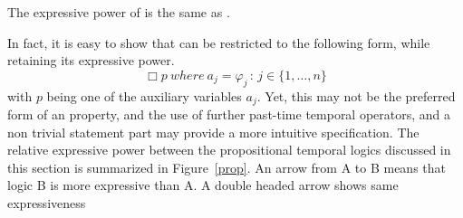 \begin{lemma}
\label{simplecase}
The expressive power of 
\EPLTL{} is the same as \QPLTL{}.
\end{lemma}
In fact, it is easy to show that \EPLTL{} can be restricted to the following form, while retaining its expressive power.
\[  \Box p {\ where\ } a_j  = \varphi_j \, : \, 
{j \in \{1, \ldots , n\}}  \] 
with $p$ being one of the auxiliary variables $a_j$. Yet, this may not be the preferred form
of an \EPLTL{} property, and the use of further past-time temporal operators, and a non trivial statement  part may provide a more intuitive specification.
The relative expressive power between the propositional temporal logics discussed in this section is summarized in Figure~\ref{prop}. An arrow from A to B means that logic  B is more expressive than A. A double headed arrow shows same expressiveness


